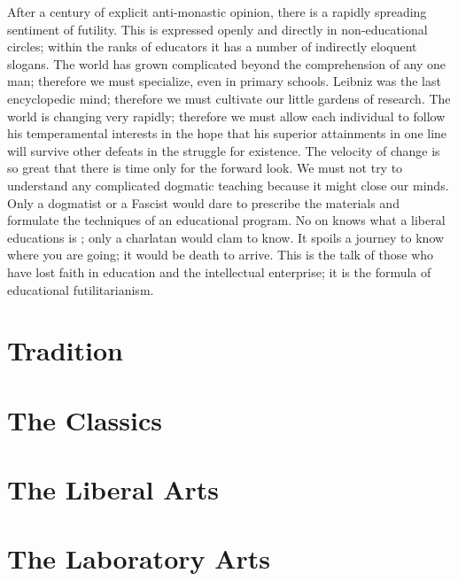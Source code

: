 \documentclass{memoir}
\begin{document}
After a century of explicit anti-monastic opinion, there is a rapidly
spreading sentiment of futility. This is expressed openly and directly
in non-educational circles; within the ranks of educators it has a
number of indirectly eloquent slogans. The world has grown complicated
beyond the comprehension of any one man; therefore we must specialize,
even in primary schools. Leibniz was the last encyclopedic mind;
therefore we must cultivate our little gardens of research. The world is
changing very rapidly; therefore we must allow each individual to follow
his temperamental interests in the hope that his superior attainments in
one line will survive other defeats in the struggle for existence. The
velocity of change is so great that  there is time only for the forward
look. We must not try to understand any complicated dogmatic teaching
because it might close our minds. Only a dogmatist or a Fascist
would dare to prescribe the materials and formulate the techniques of an
educational program. No on knows what a liberal educations is ; only a
charlatan would clam to know. It spoils a journey to know where you are
going; it would be death to arrive. This is the talk of those who have
lost faith in education and the intellectual enterprise; it is the
formula of educational futilitarianism. 
\chapter{Tradition}

\chapter{The Classics}
\chapter{The Liberal Arts}
\chapter{The Laboratory Arts}
\end{document}
